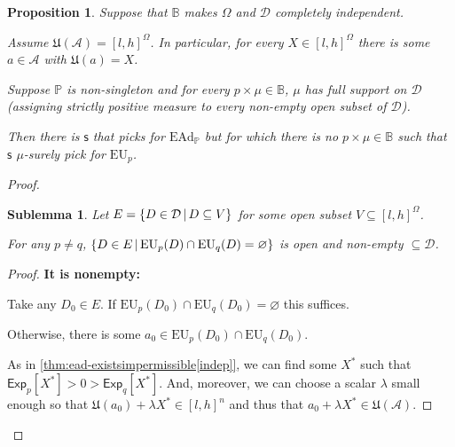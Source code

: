 \documentclass[a4paper]{article}
\newtheorem{proposition}[theorem]{Proposition}
\newtheorem{sublemma}{Sublemma}[theorem]
\newcommand\A{\mathcal{A}}
\renewcommand\P{\mathbb{P}} %
\newcommand\Exp{\mathsf{Exp}}
\newcommand\EU{\mathrm{EU}}
\newcommand\EAd{\mathrm{EAd}}
\newcommand\U{\mathfrak{U}} %
\newcommand{\D}{\mathcal{D}}
\newcommand{\Decs}{\mathcal{D}}
\newcommand\s{\mathsf{s}}
\newcommand{\IB}{\mathbb{B}}
\newcommand{\IP}{\P}
\newcommand\SetDelimiter[1][]{
	\nonscript\,#1\vert \allowbreak \nonscript\,\mathopen{}}
\providecommand\given{\SetDelimiter}
\renewcommand{\emptyset}{\varnothing}
\newenvironment{CCM rewritten}
{\begingroup\color{blue}} %
{\endgroup}              %
\begin{document}
\begin{proposition}\label{thm:ead-existsimpermissible[dep]:spreadeg}Suppose that $\IB$ makes $\Omega$ and $\Decs$ completely independent. 
	
	Assume $\U(\A)=[l,h]^\Omega$. In particular, for every $X\in [l,h]^\Omega$ there is some $a\in \A$ with $\U(a)=X$. 
	
	Suppose $\IP$ is non-singleton and for every $p \times \mu\in\IB$, $\mu$ has full support on $\Decs$ (assigning strictly positive measure to every non-empty open subset of $\Decs$).
	
	Then there is $\s$ that picks for $\EAd_\IP$ but for which there is no $p\times\mu\in \IB$ such that $\s$ $\mu$-surely pick for $\EU_p$.
	
\end{proposition}
\begin{proof}
	\begin{sublemma}
		Let $E = \{D\in\D\given D\subseteq V\}$ for some open subset $V \subseteq [l,h]^\Omega$.
		
		For any $p\neq q$,
		$\{D\in E\given \EU_{p}(D)\cap \EU_{q}(D)=\emptyset\}$ is open and non-empty $\subseteq\Decs$.
	\end{sublemma}
	\begin{proof}
		
		
		
		\textbf{It is nonempty:}
		
		Take any $D_0\in E$. If $\EU_{p}(D_0)\cap \EU_{q}(D_0)=\emptyset$ this suffices. 
		
		Otherwise, there is some $a_0\in \EU_{p}(D_0)\cap \EU_{q}(D_0)$. 
		
		As in \cref{thm:ead-existsimpermissible[indep]}, we can find some $X^*$ such that $\Exp_{p}[X^*]>0>\Exp_{q}[X^*]$. And, moreover, we can choose a scalar $\lambda$ small enough so that $\U(a_0)+\lambda X^*\in[l,h]^n$ and thus that $a_0+\lambda X^*\in\U(\A)$.%
		

\end{proof}
\end{proof}
\end{document}
